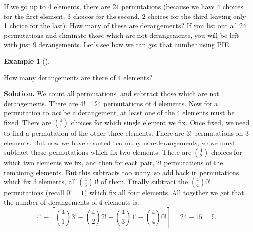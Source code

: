 \documentclass[10pt,]{book}
\theoremstyle{plain}
\theoremstyle{definition}
\newtheorem{example}[theorem]{Example}
\theoremstyle{definition}
\theoremstyle{definition}
\numberwithin{equation}{section}
\begin{document}
      If we go up to 4 elements, there are 24 permutations (because we have 4 choices for the first element, 3 choices for the second, 2 choices for the third leaving only 1 choice for the last). How many of these are derangements? If you list out all 24 permutations and eliminate those which are not derangements, you will be left with just 9 derangements. Let's see how we can get that number using PIE.
\begin{example}[]\label{example-49}

          How many derangements are there of 4 elements?
\par\medskip\noindent%
\textbf{Solution.}\quad 
          We count all permutations, and subtract those which are not derangements. There are \(4! = 24\) permutations of 4 elements. Now for a permutation to \emph{not} be a derangement, at least one of the 4 elements must be fixed. There are \({4 \choose 1}\) choices for which single element we fix. Once fixed, we need to find a permutation of the other three elements. There are \(3!\) permutations on 3 elements. But now we have counted too many non-derangements, so we must subtract those permutations which fix two elements. There are \({4 \choose 2}\) choices for which two elements we fix, and then for each pair, \(2!\) permutations of the remaining elements. But this subtracts too many, so add back in permutations which fix 3 elements, all \({4 \choose 3}1!\) of them. Finally subtract the \({4 \choose 4}0!\) permutations (recall \(0! = 1\)) which fix all four elements. All together we get that the number of derangements of 4 elements is:
          \begin{equation*}
            4! - \left[{4 \choose 1}3! - {4 \choose 2}2! + {4 \choose 3} 1! - {4 \choose 4}0!\right] = 24 - 15 = 9.
          \end{equation*}
\end{example}
\par
\end{document}
